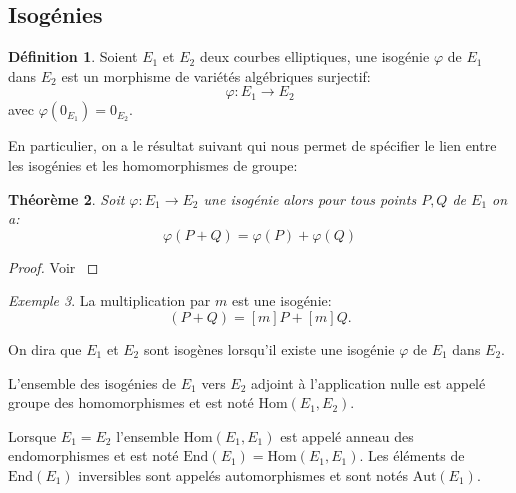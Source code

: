 \documentclass[10pt,a4paper]{book}
\theoremstyle{plain}
\newtheorem{thm}{Théorème}[chapter]
\theoremstyle{definition}
\theoremstyle{definition}
\theoremstyle{definition}
\theoremstyle{definition}
\theoremstyle{definition}
\newtheorem{defi}[thm]{Définition}
\theoremstyle{remark}
\theoremstyle{remark}
\newtheorem{exe}[thm]{Exemple}
\theoremstyle{definition}
\begin{document}
\subsection{Isogénies}

\begin{defi}
Soient $E_1$ et $E_2$ deux courbes elliptiques, une isogénie $\varphi$ de $E_1$ dans $E_2$ est un morphisme de variétés algébriques surjectif:
\begin{equation*}
\varphi:E_1 \rightarrow E_2
\end{equation*}
avec $\varphi(0_{E_1})=0_{E_2}$.
\end{defi}
En particulier, on a le résultat suivant qui nous permet de spécifier le lien 
entre les isogénies et les homomorphismes de groupe:

\begin{thm}
Soit $\varphi:E_1 \rightarrow E_2$ une isogénie alors pour tous points $P,Q$ de $E_1$ on a:
\begin{equation*}
\varphi(P+Q)=\varphi(P)+\varphi(Q)
\end{equation*}
\end{thm}

\begin{proof}
Voir \cite[Theoreme III.4.8]{Silv1}
\end{proof}

\begin{exe}
La multiplication par $m$ est une isogénie:
\begin{equation*}
[m](P+Q)=[m]P+[m]Q.
\end{equation*}
\end{exe}
%
On dira que $E_1$ et $E_2$ sont isogènes lorsqu'il existe une isogénie 
$\varphi$ de $E_1$ dans $E_2$. 

L'ensemble des isogénies de $E_1$ vers $E_2$ adjoint à l'application nulle est 
appelé groupe des homomorphismes et est noté \emph{$\mathrm{Hom}(E_1,E_2)$}. 

Lorsque $E_1=E_2$ l'ensemble $\mathrm{Hom}(E_1,E_1)$ est appelé anneau des 
endomorphismes et est noté \emph{$\mathrm{End}(E_1)=\mathrm{Hom}(E_1,E_1)$}. 
Les éléments de $\mathrm{End}(E_1)$ inversibles sont appelés automorphismes et 
sont notés \emph{$\mathrm{Aut}(E_1)$}. 
\end{document}
